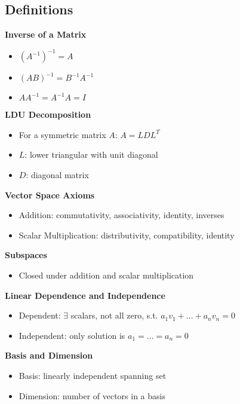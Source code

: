 \documentclass[8pt, a4paper, landscape]{extarticle}
\begin{document}
\begin{multicols*}{5}

  \section*{Definitions}

  \textbf{Inverse of a Matrix}
  \begin{itemize}
    \item $(A^{-1})^{-1} = A$
    \item $(AB)^{-1} = B^{-1}A^{-1}$
    \item $AA^{-1} = A^{-1}A = I$
  \end{itemize}

  \textbf{LDU Decomposition}
  \begin{itemize}
    \item For a symmetric matrix $A$: $A = LDL^T$
    \item $L$: lower triangular with unit diagonal
    \item $D$: diagonal matrix
  \end{itemize}

  \textbf{Vector Space Axioms}
  \begin{itemize}
    \item Addition: commutativity, associativity, identity, inverses
    \item Scalar Multiplication: distributivity, compatibility, identity
  \end{itemize}

  \textbf{Subspaces}
  \begin{itemize}
    \item Closed under addition and scalar multiplication
  \end{itemize}

  \textbf{Linear Dependence and Independence}
  \begin{itemize}
    \item Dependent: $\exists$ scalars, not all zero, s.t. $a_1v_1 + \ldots + a_nv_n = 0$
    \item Independent: only solution is $a_1 = \ldots = a_n = 0$
  \end{itemize}

  \textbf{Basis and Dimension}
  \begin{itemize}
    \item Basis: linearly independent spanning set
    \item Dimension: number of vectors in a basis
  \end{itemize}


\end{multicols*}
\end{document}
